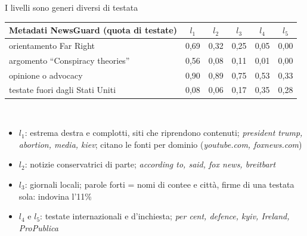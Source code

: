 \documentclass[aspectratio=169]{beamer}
\begin{document}
\begin{frame}{I livelli sono generi diversi di testata}
  \vspace{0.2em}
  \centering\footnotesize
  \begin{tabular}{lccccc}
    \toprule
    \textbf{Metadati NewsGuard} (quota di testate) & $l_1$ & $l_2$ & $l_3$ & $l_4$ & $l_5$ \\
    \midrule
    orientamento Far Right & 0,69 & 0,32 & 0,25 & 0,05 & 0,00 \\
    argomento ``Conspiracy theories'' & 0,56 & 0,08 & 0,11 & 0,01 & 0,00 \\
    opinione o advocacy & 0,90 & 0,89 & 0,75 & 0,53 & 0,33 \\
    testate fuori dagli Stati Uniti & 0,08 & 0,06 & 0,17 & 0,35 & 0,28 \\
    \bottomrule
  \end{tabular}\\[0.5em]
  \raggedright
  \begin{itemize}[<+->]
    \footnotesize
    \item $l_1$: estrema destra e complotti, siti che riprendono contenuti; \textit{president trump, abortion, media, kiev}; citano le fonti per dominio (\textit{youtube.com, foxnews.com})
    \item $l_2$: notizie conservatrici di parte; \textit{according to, said, fox news, breitbart}
    \item $l_3$: giornali locali; parole forti = nomi di contee e citt\`a, firme di una testata sola: indovina l'11\%
    \item $l_4$ e $l_5$: testate internazionali e d'inchiesta; \textit{per cent, defence, kyiv, Ireland, ProPublica}
  \end{itemize}
\end{frame}
\end{document}
